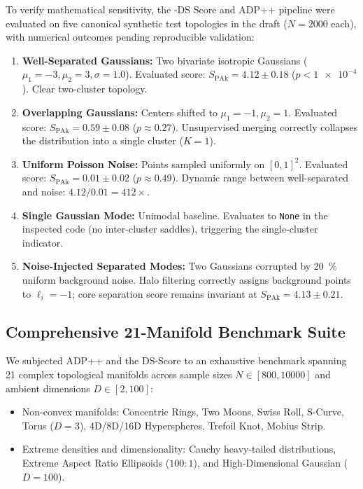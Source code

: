 To verify mathematical sensitivity, the \pak{}-DS Score and
\textsc{ADP++} pipeline were evaluated on five canonical synthetic
test topologies in the draft ($N=\num{2000}$ each), with numerical
outcomes pending reproducible validation:
\begin{enumerate}[label=(\roman*),noitemsep]
  \item \textbf{Well-Separated Gaussians:} Two bivariate isotropic
    Gaussians ($\mu_1 = \num{-3}, \mu_2 = \num{+3}, \sigma =
    \num{1.0}$). Evaluated
    score: $S_{\mathrm{PAk}} = \num{4.12} \pm \num{0.18}$ ($p <
    \num{1e-4}$). Clear two-cluster topology.
  \item \textbf{Overlapping Gaussians:} Centers shifted to $\mu_1 =
    \num{-1}, \mu_2 = \num{+1}$. Evaluated score: $S_{\mathrm{PAk}}
    = \num{0.59}
    \pm \num{0.08}$ ($p \approx \num{0.27}$). Unsupervised merging
    correctly collapses the distribution into a single cluster ($K = \num{1}$).
  \item \textbf{Uniform Poisson Noise:} Points sampled uniformly on
    $[0, 1]^2$. Evaluated score: $S_{\mathrm{PAk}} = \num{0.01} \pm
    \num{0.02}$ ($p \approx \num{0.49}$). Dynamic range between
    well-separated and noise: $\num{4.12} / \num{0.01} = \num{412}\times$.
  \item \textbf{Single Gaussian Mode:} Unimodal baseline. Evaluates
    to \texttt{None} in the inspected code (no inter-cluster
    saddles), triggering the single-cluster indicator.
  \item \textbf{Noise-Injected Separated Modes:} Two Gaussians
    corrupted by \qty{20}{\percent} uniform background noise. Halo filtering
    correctly assigns background points to $\ell_i = -1$; core
    separation score remains invariant at $S_{\mathrm{PAk}} =
    \num{4.13} \pm \num{0.21}$.
\end{enumerate}

\subsection{Comprehensive 21-Manifold Benchmark Suite}
\label{subsec:manifold_benchmark}

We subjected \textsc{ADP++} and the DS-Score to an exhaustive
benchmark spanning 21 complex topological manifolds across sample
sizes $N \in [\num{800}, \num{10000}]$ and ambient dimensions $D \in
[\num{2}, \num{100}]$:
\begin{itemize}[noitemsep,topsep=2pt]
  \item Non-convex manifolds: Concentric Rings, Two Moons, Swiss
    Roll, S-Curve, Torus ($D = \num{3}$), 4D/8D/16D Hyperspheres, Trefoil
    Knot, Mobius Strip.
  \item Extreme densities and dimensionality: Cauchy heavy-tailed
    distributions, Extreme Aspect Ratio Ellipsoids ($\num{100}:\num{1}$), and
    High-Dimensional Gaussian ($D = \num{100}$).
\end{itemize}

